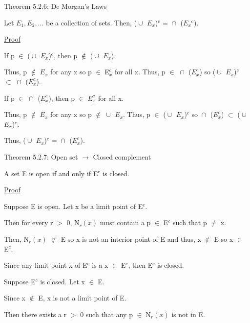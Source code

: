 { \color{red} Theorem 5.2.6: De Morgan's Laws } 
	
	\begin{adjustbox}{minipage=14cm, right, vspace=0.1cm 0cm}
		Let $E_1, E_2 , ... $ be a collection of sets. Then,
		($\cup_{}^{}$ $E_x$)$^\text{c}$ = $\cap_{}^{}$ ($E_x$$^\text{c}$).
	\end{adjustbox}

{ \color{magenta} \underline{Proof} } 
	
	If p $\in$ ($\cup_{}^{}$ $E_x$)$^\text{c}$, then p $\not \in$ ($\cup_{}^{}$ $E_x$).

	Thus, p $\not \in$ $E_x$ for any x so p $\in$ E$_x^\text{c}$ for all x.
	Thus, p $\in$ $\cap_{}^{}$ ($E_x^c$) so
	($\cup_{}^{}$ $E_x$)$^c$ $\subset$ $\cap_{}^{}$ ($E_x^c$).

	If p $\in$ $\cap_{}^{}$ ($E_x^c$), then p $\in$ $E_x^c$ for all x.
	
	Thus, p $\not \in$ $E_x$ for any x so p $\not \in$ $\cup_{}^{}$ $E_x$.
	Thus, p $\in$ ($\cup_{}^{}$ $E_x$)$^c$ so
	$\cap_{}^{}$ ($E_x^c$) $\subset$ ($\cup_{}^{}$ $E_x$)$^c$.

	Thus, ($\cup_{}^{}$ $E_x$)$^c$ = $\cap_{}^{}$ ($E_x^c$). \\

\newpage

{ \color{red} Theorem 5.2.7: Open set $\rightarrow$ Closed complement } 

	\begin{adjustbox}{minipage=14cm, right, vspace=0.1cm 0cm}
		A set E is open if and only if E$^\text{c}$ is closed.
	\end{adjustbox}

{ \color{magenta} \underline{Proof} } 

	Suppose E is open. Let x be a limit point of E$^c$.

	Then for every r $>$ 0, N$_r(x)$ must contain a p $\in$ E$^c$ such that p $\neq$ x.

	Then, N$_r(x)$ $\not \subset$ E so x is not an interior point of E and
	thus, x $\not \in$ E so x $\in$ E$^c$.

	Since any limit point x of E$^c$ is a x $\in$ E$^c$, then E$^c$ is closed.

	\vspace{0.2cm}

	Suppose E$^c$ is closed. Let x $\in$ E.

	Since x $\not \in$ E, x is not a limit point of E.

	Then there exists a r $>$ 0 such that any p $\in$ N$_r(x)$ is not in E.

